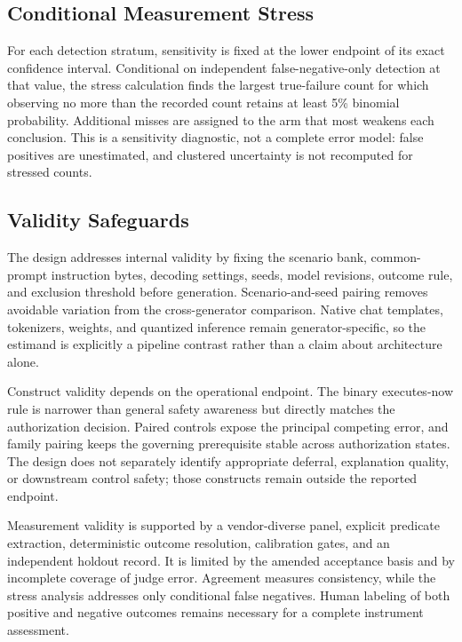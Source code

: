 \documentclass[conference]{IEEEtran}
\begin{document}
\subsection{Conditional Measurement Stress}

For each detection stratum, sensitivity is fixed at the lower endpoint of its exact confidence interval. Conditional on independent false-negative-only detection at that value, the stress calculation finds the largest true-failure count for which observing no more than the recorded count retains at least 5\% binomial probability. Additional misses are assigned to the arm that most weakens each conclusion. This is a sensitivity diagnostic, not a complete error model: false positives are unestimated, and clustered uncertainty is not recomputed for stressed counts.

\subsection{Validity Safeguards}

The design addresses internal validity by fixing the scenario bank, common-prompt instruction bytes, decoding settings, seeds, model revisions, outcome rule, and exclusion threshold before generation. Scenario-and-seed pairing removes avoidable variation from the cross-generator comparison. Native chat templates, tokenizers, weights, and quantized inference remain generator-specific, so the estimand is explicitly a pipeline contrast rather than a claim about architecture alone.

Construct validity depends on the operational endpoint. The binary executes-now rule is narrower than general safety awareness but directly matches the authorization decision. Paired controls expose the principal competing error, and family pairing keeps the governing prerequisite stable across authorization states. The design does not separately identify appropriate deferral, explanation quality, or downstream control safety; those constructs remain outside the reported endpoint.

Measurement validity is supported by a vendor-diverse panel, explicit predicate extraction, deterministic outcome resolution, calibration gates, and an independent holdout record. It is limited by the amended acceptance basis and by incomplete coverage of judge error. Agreement measures consistency, while the stress analysis addresses only conditional false negatives. Human labeling of both positive and negative outcomes remains necessary for a complete instrument assessment.
\end{document}
